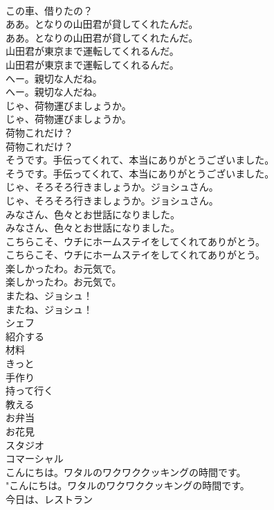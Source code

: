 \documentclass[8pt]{extreport}
\begin{document}
\begin{CJK}{UTF8}{min}
\\	この車、借りたの？ 
\\	ああ。となりの山田君が貸してくれたんだ。	
\\	ああ。となりの山田君が貸してくれたんだ。 
\\	山田君が東京まで運転してくれるんだ。	
\\	山田君が東京まで運転してくれるんだ。 
\\	へー。親切な人だね。	
\\	へー。親切な人だね。 
\\	じゃ、荷物運びましょうか。	
\\	じゃ、荷物運びましょうか。 
\\	荷物これだけ？	
\\	荷物これだけ？ 
\\	そうです。手伝ってくれて、本当にありがとうございました。	
\\	そうです。手伝ってくれて、本当にありがとうございました。 
\\	じゃ、そろそろ行きましょうか。ジョシュさん。	
\\	じゃ、そろそろ行きましょうか。ジョシュさん。 
\\	みなさん、色々とお世話になりました。	
\\	みなさん、色々とお世話になりました。 
\\	こちらこそ、ウチにホームステイをしてくれてありがとう。	
\\	こちらこそ、ウチにホームステイをしてくれてありがとう。 
\\	楽しかったわ。お元気で。	
\\	楽しかったわ。お元気で。 
\\	またね、ジョシュ！	
\\	またね、ジョシュ！ 
\\	シェフ
\\	紹介する
\\	材料
\\	きっと
\\	手作り
\\	持って行く
\\	教える
\\	お弁当
\\	お花見
\\	スタジオ
\\	コマーシャル
\\	こんにちは。ワタルのワクワククッキングの時間です。	
\\	"こんにちは。ワタルのワクワククッキングの時間です。 
\\	今日は、レストラン 

\end{CJK}
\end{document}
